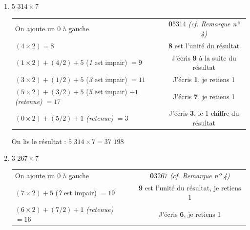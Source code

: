 \documentclass[a4paper, twoside]{article}
\begin{document}
		\begin{small}
		\begin{enumerate}

			\item $5$ $314 \times 7$
			
			\begin{tabular}{l|c}

				On ajoute un 0 à gauche & \textbf{0}5314 \textit{(cf. Remarque nº 4)}
				
				\tabularnewline
				
				$(4 \times 2) = 8$ & \textbf{8} est l'unité du résultat
				
				\tabularnewline
				
				$(1 \times 2) + (4 / 2) + 5$ (\textit{1} est impair) $= 9$ & J'écris \textbf{9} à la suite du résultat
				
				\tabularnewline
				
				$(3 \times 2) + (1 / 2) + 5$ (\textit{3} est impair) $= 11$ & J'écris \textbf{1}, je retiens 1
				
				\tabularnewline
				
				$(5 \times 2) + (3 / 2) + 5$ (\textit{5} est impair) $+ 1$ \textit{(retenue)} $= 17$ & J'écris \textbf{7}, je retiens 1
				
				\tabularnewline
				
				$(0 \times 2) + (5 / 2) + 1$ \textit{(retenue)} $= 3$ & J'écris \textbf{3}, le 1\up{er} chiffre du résultat
				
			\end{tabular}
			
			On lis le résultat : {\boldmath $5$ $314 \times 7 = 37$ $198$}\\	





			\item $3$ $267 \times 7$
			
			\begin{tabular}{l|c}

				On ajoute un 0 à gauche & \textbf{0}3267 \textit{(cf. Remarque nº 4)}
				
				\tabularnewline
				
				$(7 \times 2) + 5$ (\textit{7} est impair) $= 19$ & \textbf{9} est l'unité du résultat, je retiens 1
				
				\tabularnewline
				
				$(6 \times 2) + (7 / 2) + 1$ \textit{(retenue)} $= 16$ & J'écris \textbf{6}, je retiens 1
				

\end{tabular}
\end{enumerate}
\end{small}
\end{document}
